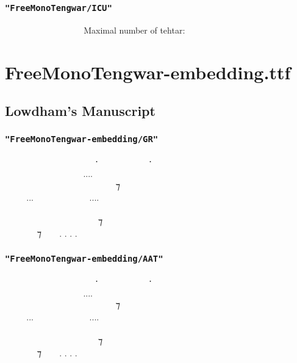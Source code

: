 \documentclass[11pt,a4paper]{article}
\begin{document}
\subsubsection*{\texttt{"FreeMonoTengwar/ICU"}}

\freeICU      \normalfont Maximal number of tehtar:
\freeICU 


\newpage

\section{FreeMonoTengwar-embedding.ttf}

\subsection{Lowdham’s Manuscript}

\subsubsection*{\texttt{"FreeMonoTengwar-embedding/GR"}}

\embedGR
  ‍   ⸱‍  ‍ ⸱ \\
    ‍....  ‍  \\
  ‍   ‍ ‍ ⁊ ‍  \\
...  ....   \\
         ‍ \\
 ‍ ‍‍   ⁊  ‍ ‍ \\
 ‍ ⁊  . . . . \normalfont

\subsubsection*{\texttt{"FreeMonoTengwar-embedding/AAT"}}

\embedAAT
  ‍   ⸱‍  ‍ ⸱ \\
    ‍....  ‍  \\
  ‍   ‍ ‍ ⁊ ‍  \\
...  ....   \\
         ‍ \\
 ‍ ‍‍   ⁊  ‍ ‍ \\
 ‍ ⁊  . . . . \normalfont
\end{document}
